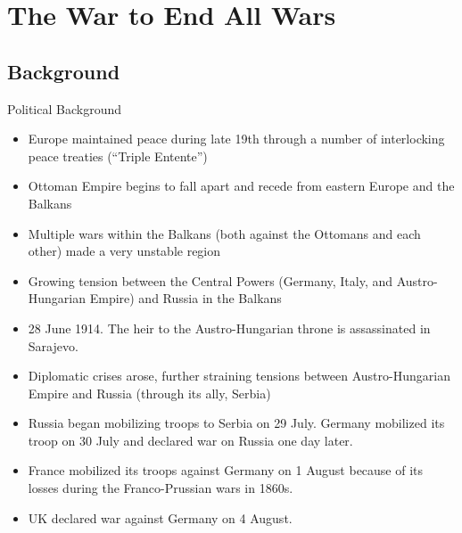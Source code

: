 

\section{The War to End All Wars}
\subsection{Background}
\begin{frame}{Political Background}
	
	\begin{itemize}
		\item<1,3->Europe maintained peace during late 19th through a number of interlocking peace treaties (``Triple Entente'')
		\item<3->Ottoman Empire begins to fall apart and recede from eastern Europe and the Balkans
		\item<4->Multiple wars within the Balkans (both against the Ottomans and each other) made a very unstable region
		\item<5->Growing tension between the Central Powers (Germany, Italy, and Austro-Hungarian Empire) and Russia in the Balkans
		\item<6->28 June 1914. The heir to the Austro-Hungarian throne is assassinated in Sarajevo.
		\item<7->Diplomatic crises arose, further straining tensions between Austro-Hungarian Empire and Russia (through its ally, Serbia)
		\item<8->Russia began mobilizing troops to Serbia on 29 July. Germany mobilized its troop on 30 July and declared war on Russia one day later.
		\item<9->France mobilized its troops against Germany on 1 August because of its losses during the Franco-Prussian wars in 1860s.
		\item<10->UK declared war against Germany on 4 August.
	\end{itemize}
\end{frame}

